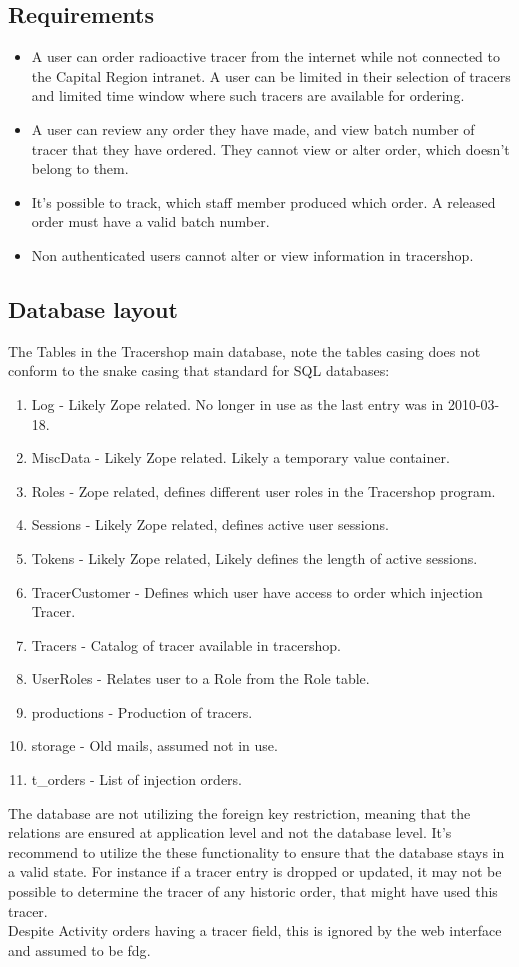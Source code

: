 \documentclass{article}
\begin{document}
\subsection*{Requirements}

\begin{itemize}
  \item A user can order radioactive tracer from the internet while not connected to the Capital Region intranet.
  A user can be limited in their selection of tracers and limited time window where such tracers are available for ordering.
  \item A user can review any order they have made, and view batch number of tracer that they have ordered. They cannot view or alter order, which doesn't belong to them.
  \item It's possible to track, which staff member produced which order. A released order must have a valid batch number.
  \item Non authenticated users cannot alter or view information in tracershop.
\end{itemize}

\subsection*{Database layout}
The Tables in the Tracershop main database, note the tables casing does not conform to the snake casing that standard for SQL databases:
\begin{enumerate}
  \item Log - Likely Zope related. No longer in use as the last entry was in 2010-03-18.
  \item MiscData - Likely Zope related. Likely a temporary value container.
  \item Roles - Zope related, defines different user roles in the Tracershop program.
  \item Sessions - Likely Zope related, defines active user sessions.
  \item Tokens - Likely Zope related, Likely defines the length of active sessions.
  \item TracerCustomer - Defines which user have access to order which injection Tracer.
  \item Tracers - Catalog of tracer available in tracershop.
  \item UserRoles - Relates user to a Role from the Role table.
  \item productions - Production of tracers.
  \item storage - Old mails, assumed not in use.
  \item t\_orders - List of injection orders.
\end{enumerate}
The database are not utilizing the foreign key restriction, meaning that the relations are ensured at application level and not the database level.
It's recommend to utilize the these functionality to ensure that the database stays in a valid state.
For instance if a tracer entry is dropped or updated, it may not be possible to determine the tracer of any historic order, that might have used this tracer.\\
Despite Activity orders having a tracer field, this is ignored by the web interface and assumed to be \Gls{fdg}.
\end{document}
